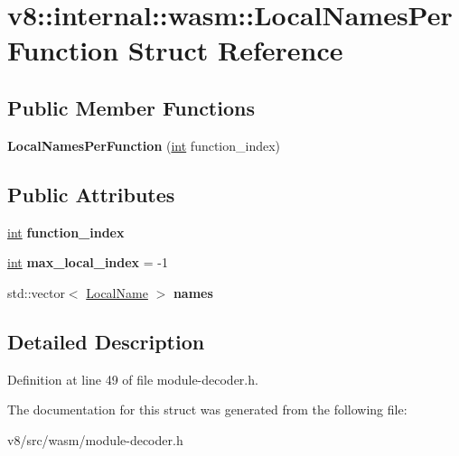 \hypertarget{structv8_1_1internal_1_1wasm_1_1LocalNamesPerFunction}{}\section{v8\+:\+:internal\+:\+:wasm\+:\+:Local\+Names\+Per\+Function Struct Reference}
\label{structv8_1_1internal_1_1wasm_1_1LocalNamesPerFunction}
\subsection*{Public Member Functions}
\begin{DoxyCompactItemize}
\item 
\mbox{\label{structv8_1_1internal_1_1wasm_1_1LocalNamesPerFunction_ab207b66fab76b1845a433ce510ba84e7}} 
{\bfseries Local\+Names\+Per\+Function} (\mbox{\hyperlink{classint}{int}} function\+\_\+index)
\end{DoxyCompactItemize}
\subsection*{Public Attributes}
\begin{DoxyCompactItemize}
\item 
\mbox{\label{structv8_1_1internal_1_1wasm_1_1LocalNamesPerFunction_a7e4f04626ab2bc3563556682c385a765}} 
\mbox{\hyperlink{classint}{int}} {\bfseries function\+\_\+index}
\item 
\mbox{\label{structv8_1_1internal_1_1wasm_1_1LocalNamesPerFunction_a97d15bb7dbf0804f563e51070b930338}} 
\mbox{\hyperlink{classint}{int}} {\bfseries max\+\_\+local\+\_\+index} = -\/1
\item 
\mbox{\label{structv8_1_1internal_1_1wasm_1_1LocalNamesPerFunction_a24bfee8c61b42e98623fa1be0cea0ef5}} 
std\+::vector$<$ \mbox{\hyperlink{structv8_1_1internal_1_1wasm_1_1LocalName}{Local\+Name}} $>$ {\bfseries names}
\end{DoxyCompactItemize}


\subsection{Detailed Description}


Definition at line 49 of file module-\/decoder.\+h.



The documentation for this struct was generated from the following file\+:\begin{DoxyCompactItemize}
\item 
v8/src/wasm/module-\/decoder.\+h\end{DoxyCompactItemize}

